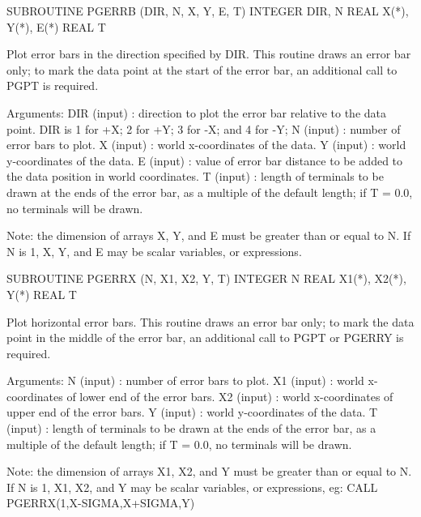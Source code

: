 {\eightpoint\begintt
      SUBROUTINE PGERRB (DIR, N, X, Y, E, T)
      INTEGER DIR, N
      REAL X(*), Y(*), E(*)
      REAL T
 
Plot error bars in the direction specified by DIR.
This routine draws an error bar only; to mark the data point at
the start of the error bar, an additional call to PGPT is required.
 
Arguments:
 DIR    (input)  : direction to plot the error bar relative to
                   the data point.  DIR is 1 for +X; 2 for +Y;
                   3 for -X; and 4 for -Y;
 N      (input)  : number of error bars to plot.
 X      (input)  : world x-coordinates of the data.
 Y      (input)  : world y-coordinates of the data.
 E      (input)  : value of error bar distance to be added to the
                   data position in world coordinates.
 T      (input)  : length of terminals to be drawn at the ends
                   of the error bar, as a multiple of the default
                   length; if T = 0.0, no terminals will be drawn.
 
Note: the dimension of arrays X, Y, and E must be greater
than or equal to N. If N is 1, X, Y, and E may be scalar
variables, or expressions.
\endtt}

{\eightpoint\begintt
      SUBROUTINE PGERRX (N, X1, X2, Y, T)
      INTEGER N
      REAL X1(*), X2(*), Y(*)
      REAL T
 
Plot horizontal error bars.
This routine draws an error bar only; to mark the data point in
the middle of the error bar, an additional call to PGPT or
PGERRY is required.
 
Arguments:
 N      (input)  : number of error bars to plot.
 X1     (input)  : world x-coordinates of lower end of the
                   error bars.
 X2     (input)  : world x-coordinates of upper end of the
                   error bars.
 Y      (input)  : world y-coordinates of the data.
 T      (input)  : length of terminals to be drawn at the ends
                   of the error bar, as a multiple of the default
                   length; if T = 0.0, no terminals will be drawn.
 
Note: the dimension of arrays X1, X2, and Y must be greater
than or equal to N. If N is 1, X1, X2, and Y may be scalar
variables, or expressions, eg:
      CALL PGERRX(1,X-SIGMA,X+SIGMA,Y)
\endtt}


